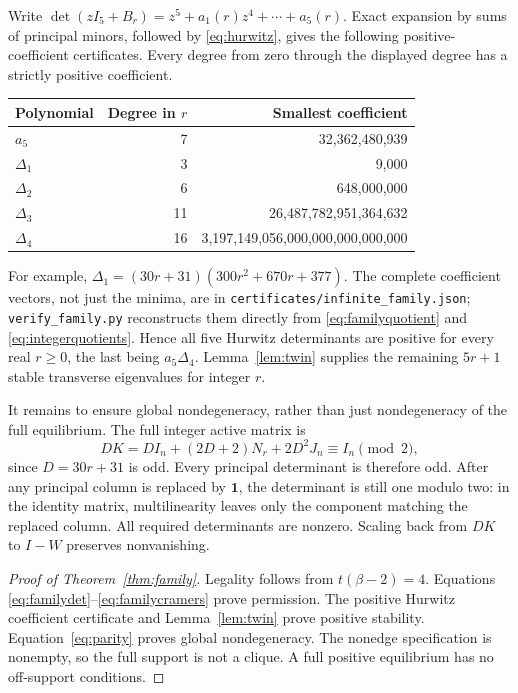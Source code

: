 \documentclass[11pt,a4paper]{article}
\theoremstyle{definition}\newtheorem{definition}[theorem]{Definition}
\theoremstyle{remark}\newtheorem{remark}[theorem]{Remark}
\newcommand{\ones}{\mathbf{1}}
\newcommand{\code}[1]{\texttt{\small #1}}
\begin{document}
Write $\det(zI_5+B_r)=z^5+a_1(r)z^4+\cdots+a_5(r)$. Exact expansion by sums of principal minors, followed by \eqref{eq:hurwitz}, gives the following positive-coefficient certificates. Every degree from zero through the displayed degree has a strictly positive coefficient.
\begin{center}
\begin{tabular}{lrr}\toprule
Polynomial & Degree in $r$ & Smallest coefficient\\\midrule
$a_5$&7&32,362,480,939\\
$\Delta_1$&3&9,000\\
$\Delta_2$&6&648,000,000\\
$\Delta_3$&11&26,487,782,951,364,632\\
$\Delta_4$&16&3,197,149,056,000,000,000,000,000\\\bottomrule
\end{tabular}
\end{center}
For example, $\Delta_1=(30r+31)(300r^2+670r+377)$. The complete coefficient vectors, not just the minima, are in \code{certificates/infinite\_family.json}; \code{verify\_family.py} reconstructs them directly from \eqref{eq:familyquotient} and \eqref{eq:integerquotients}. Hence all five Hurwitz determinants are positive for every real $r\geq0$, the last being $a_5\Delta_4$. Lemma~\ref{lem:twin} supplies the remaining $5r+1$ stable transverse eigenvalues for integer $r$.

It remains to ensure global nondegeneracy, rather than just nondegeneracy of the full equilibrium. The full integer active matrix is
\begin{equation}\label{eq:parity}
 D K=D I_n+(2D+2)N_r+2D^2J_n\equiv I_n\pmod2,
\end{equation}
since $D=30r+31$ is odd. Every principal determinant is therefore odd. After any principal column is replaced by $\ones$, the determinant is still one modulo two: in the identity matrix, multilinearity leaves only the component matching the replaced column. All required determinants are nonzero. Scaling back from $DK$ to $I-W$ preserves nonvanishing.

\begin{proof}[Proof of Theorem~\ref{thm:family}]
Legality follows from $t(\beta-2)=4$. Equations \eqref{eq:familydet}--\eqref{eq:familycramers} prove permission. The positive Hurwitz coefficient certificate and Lemma~\ref{lem:twin} prove positive stability. Equation~\eqref{eq:parity} proves global nondegeneracy. The nonedge specification is nonempty, so the full support is not a clique. A full positive equilibrium has no off-support conditions.
\end{proof}
\end{document}
